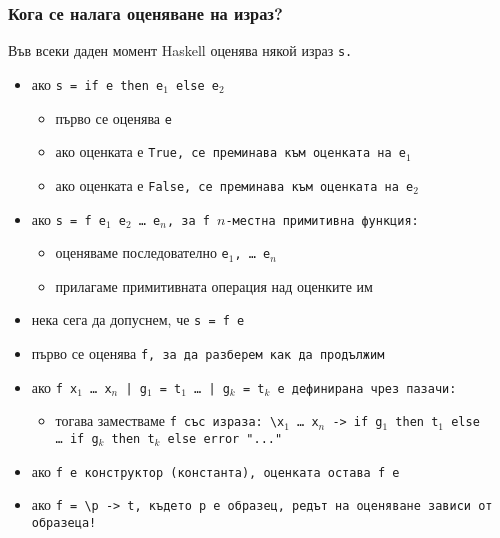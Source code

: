 \documentclass{beamer}
\begin{document}
\begin{frame}
  \frametitle{Кога се налага оценяване на израз?}
  Във всеки даден момент Haskell оценява някой израз \tt s. \pause
  \begin{itemize}[<+->]
  \item ако \tt{s = if e then e$_1$ else e$_2$}
    \begin{itemize}
    \item първо се оценява \tt e
    \item ако оценката е \tt{True}, се преминава към оценката на e$_1$
    \item ако оценката е \tt{False}, се преминава към оценката на e$_2$
    \end{itemize}
  \item ако \tt{s = f e$_1$ e$_2$ \ldots\ e$_n$}, за \tt f $n$-местна примитивна функция:
    \begin{itemize}
    \item оценяваме последователно \tt{e$_1$}, \ldots\ \tt{e$_n$}
    \item прилагаме примитивната операция над оценките им
    \end{itemize}
  \item нека сега да допуснем, че \tt{s = f e}
  \item първо се оценява \tt f, за да разберем как да продължим
  \item ако \tt{f x$_1$ \ldots\ x$_n$ | g$_1$ = t$_1$ \ldots\ | g$_k$ = t$_k$} е дефинирана чрез пазачи:
    \begin{itemize}
    \item тогава заместваме \tt f със израза: \tt{\textbackslash x$_1$ \ldots\ x$_n$ -> if g$_1$ then t$_1$ else \ldots\ if g$_k$ then t$_k$ else error "..."}

    \end{itemize}
  \item ако \tt f е конструктор (константа), \alert{оценката остава \tt{f e}}
  \item ако \tt{f = \textbackslash p -> t}, където \tt p е образец, редът на оценяване зависи от образеца!
  \end{itemize}
\end{frame}
\end{document}
